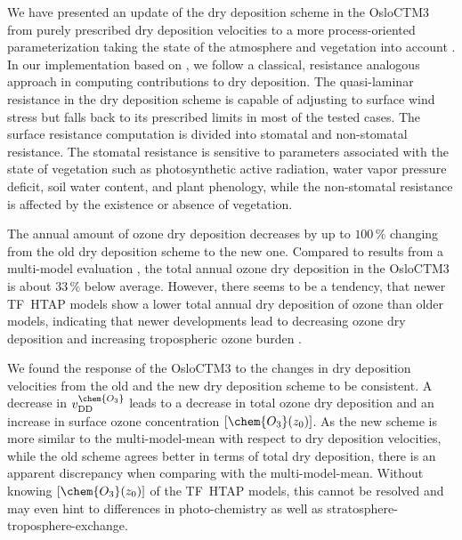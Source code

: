 \documentclass[gmd, manuscript]{copernicus}
\begin{document}
\label{sec:conc}
We have presented an update of the dry deposition scheme in the OsloCTM3 from purely prescribed dry deposition velocities \citep{AE:Wesely1989,JGR:Hough1991} to a more process-oriented parameterization taking the state of the atmosphere and vegetation into account \citep{ACP:Simpson2012}. In our implementation based on \citet{ACP:Simpson2012}, we follow a classical, resistance analogous approach in computing contributions to dry deposition. The quasi-laminar resistance in the dry deposition scheme is capable of adjusting to surface wind stress but falls back to its prescribed limits in most of the tested cases. The surface resistance computation is divided into stomatal and non-stomatal resistance. The stomatal resistance is sensitive to parameters associated with the state of vegetation such as photosynthetic active radiation, water vapor pressure deficit, soil water content, and plant phenology, while the non-stomatal resistance is affected by the existence or absence of vegetation.

The annual amount of ozone dry deposition decreases by up to $100\,\unit{\%}$ changing from the old dry deposition scheme to the new one. Compared to results from a multi-model evaluation \citep{ACP:Hardacre2015}, the total annual ozone dry deposition in the OsloCTM3 is about $33\,\unit{\%}$ below average. However, there seems to be a tendency, that newer TF~HTAP models show a lower total annual dry deposition of ozone than older models, indicating that newer developments lead to decreasing ozone dry deposition and increasing tropospheric ozone burden \citep[e.g.,][]{ACP:Luhar2017,AE:Hu2017}.

We found the response of the OsloCTM3 to the changes in dry deposition velocities from the old and the new dry deposition scheme to be consistent. A decrease in $v_\text{DD}^\chem{O_3}$ leads to a decrease in total ozone dry deposition and an increase in surface ozone concentration $[\chem{O_3}(z_0)]$. As the new scheme is more similar to the multi-model-mean \citep{ACP:Hardacre2015} with respect to dry deposition velocities, while the old scheme agrees better in terms of total dry deposition, there is an apparent discrepancy when comparing with the multi-model-mean. Without knowing $[\chem{O_3}(z_0)]$ of the TF~HTAP models, this cannot be resolved and may even hint to differences in photo-chemistry as well as stratosphere-troposphere-exchange. 
\end{document}
